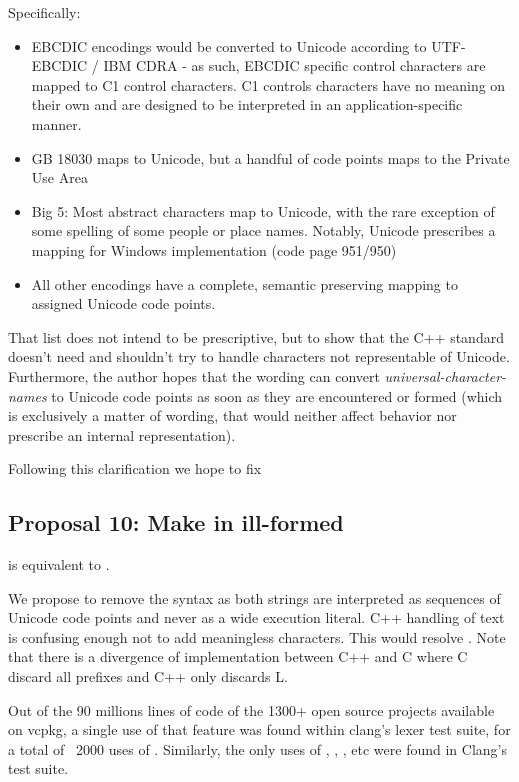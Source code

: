 \documentclass{wg21}
\begin{document}
Specifically:
\begin{itemize}
    \item EBCDIC encodings would be converted to Unicode according to UTF-EBCDIC / IBM CDRA - as such, EBCDIC specific control characters are mapped to C1 control characters. C1 controls characters have no meaning on their own and are designed to be interpreted in an application-specific manner.
    \item GB 18030 maps to Unicode, but a handful of code points maps to the Private Use Area
    \item Big 5: Most abstract characters map to Unicode, with the rare exception of some spelling of some people or place names. Notably, Unicode prescribes a mapping for Windows implementation (code page 951/950)
    \item All other encodings have a complete, semantic preserving mapping to assigned Unicode code points.
\end{itemize}

That list does not intend to be prescriptive, but to show that the C++ standard doesn't need and shouldn't try to handle characters not representable of Unicode.
Furthermore, the author hopes that the wording can convert \emph{universal-character-names} to Unicode code points as soon as they are encountered or formed (which is exclusively a matter of wording,
that would neither affect behavior nor prescribe an internal representation). 

Following this clarification we hope to fix 


\subsection{Proposal 10: Make  in  ill-formed}

 is equivalent to .

We propose to remove the  syntax as both strings are interpreted as sequences of Unicode code points and never as a wide execution literal.
C++ handling of text is confusing enough not to add meaningless characters. This would resolve .
Note that there is a divergence of implementation between C++ and C where C discard all prefixes and C++ only discards L.
 
Out of the 90 millions lines of code of the 1300+ open source projects available on vcpkg, a single use of that feature was found within clang's lexer test suite, for a total of ~2000 uses of .
Similarly, the only uses of , , , etc were found in Clang's  test suite.
\end{document}
